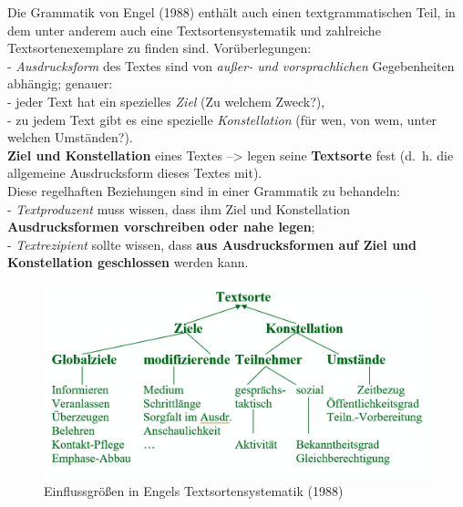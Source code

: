 \documentclass[
  letterpaper,
]{scrbook}
\begin{document}
Die Grammatik von Engel (1988) enthält auch einen textgrammatischen
Teil, in dem unter anderem auch eine Textsortensystematik und zahlreiche
Textsortenexemplare zu finden sind. Vorüberlegungen:\\
- \emph{Ausdrucksform} des Textes sind von \emph{außer- und
vorsprachlichen} Gegebenheiten abhängig; genauer:\\
- jeder Text hat ein spezielles \emph{Ziel} (Zu welchem Zweck?),\\
- zu jedem Text gibt es eine spezielle \emph{Konstellation} (für wen,
von wem, unter welchen Umständen?).\\

\textbf{Ziel und Konstellation} eines Textes --\textgreater{} legen
seine \textbf{Textsorte} fest (d.~h. die allgemeine Ausdrucksform dieses
Textes mit).\\

Diese regelhaften Beziehungen sind in einer Grammatik zu behandeln:\\
- \emph{Textproduzent} muss wissen, dass ihm Ziel und Konstellation\\
\textbf{Ausdrucksformen vorschreiben oder nahe legen};\\
- \emph{Textrezipient} sollte wissen, dass \textbf{aus Ausdrucksformen
auf Ziel und Konstellation geschlossen} werden kann.\\

\begin{figure}

{\centering \includegraphics[width=1\textwidth,height=\textheight]{./pictures/Engels_Textsortensystematik.png}

}

\caption{Einflussgrößen in Engels Textsortensystematik (1988)}

\end{figure}
\end{document}
